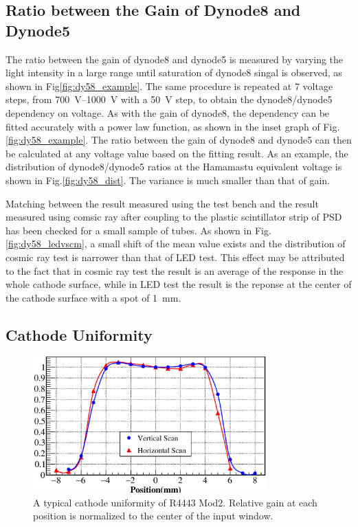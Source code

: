 \documentclass[5p, times]{elsarticle}
\begin{document}
\subsection{Ratio between the Gain of Dynode8 and Dynode5}
\label{sec:psd_dy58}

The ratio between the gain of dynode8 and dynode5 is measured by varying the light intensity in a large range until saturation of dynode8 singal is observed, as shown in Fig\ref{fig:dy58_example}.
The same procedure is repeated at 7 voltage steps, from \SIrange{700}{1000}{\volt} with a \SI{50}{\volt} step, to obtain the dynode8/dynode5 dependency on voltage.
As with the gain of dynode8, the dependency can be fitted accurately with a power law function, as shown in the inset graph of Fig.\ref{fig:dy58_example}.
The ratio between the gain of dynode8 and dynode5 can then be calculated at any voltage value based on the fitting result.
As an example, the distribution of dynode8/dynode5 ratios at the Hamamastu equivalent voltage is shown in Fig.\ref{fig:dy58_dist}.
The variance is much smaller than that of gain.

Matching between the result measured using the test bench and the result measured using comsic ray after coupling to the plastic scintillator strip of PSD has been checked for a small sample of tubes.
As shown in Fig.\ref{fig:dy58_ledvscm}, a small shift of the mean value exists and the distribution of cosmic ray test is narrower than that of LED test. 
This effect may be attributed to the fact that in cosmic ray test the result is an average of the response in the whole cathode surface, while in LED test the result is the reponse at the center of the cathode surface with a spot of \SI{1}{\milli\meter}.


\subsection{Cathode Uniformity}
\label{sec:psd_cathodescan}

\begin{figure}
 \centering
 \includegraphics[width=90mm]{cathode_uniformity}
\caption{A typical cathode uniformity of R4443 Mod2.
Relative gain at each position is normalized to the center of the input window.}
\label{fig:cathode_uniformity}
\end{figure} 
\end{document}
